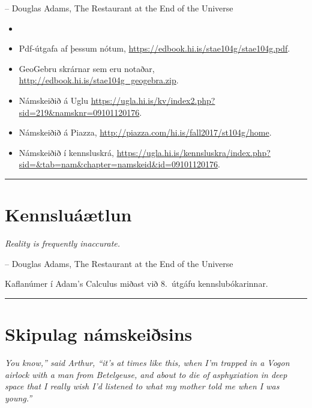 \documentclass[a4paper,10pt,icelandic]{sphinxmanual}
\begin{document}
-- Douglas Adams, The Restaurant at the End of the Universe
\begin{itemize}
\item {} 

\item {} 
Pdf-útgafa af þessum nótum, \href{https://edbook.hi.is/stae104g/stae104g.pdf}{https://edbook.hi.is/stae104g/stae104g.pdf}.

\item {} 
GeoGebru skrárnar sem eru notaðar, \href{http://edbook.hi.is/stae104g\_geogebra.zip}{http://edbook.hi.is/stae104g\_geogebra.zip}.

\item {} 
Námskeiðið á Uglu \href{https://ugla.hi.is/kv/index2.php?sid=219\&namsknr=09101120176}{https://ugla.hi.is/kv/index2.php?sid=219\&namsknr=09101120176}.

\item {} 
Námskeiðið á Piazza, \href{http://piazza.com/hi.is/fall2017/st104g/home}{http://piazza.com/hi.is/fall2017/st104g/home}.

\item {} 
Námskeiðið í kennsluskrá, \href{https://ugla.hi.is/kennsluskra/index.php?sid=\&tab=nam\&chapter=namskeid\&id=09101120176}{https://ugla.hi.is/kennsluskra/index.php?sid=\&tab=nam\&chapter=namskeid\&id=09101120176}.

\end{itemize}
\newpage

\bigskip\hrule{}\bigskip



\section{Kennsluáætlun}
\label{vidauki:kennsluaaetlun}
\emph{Reality is frequently inaccurate.}

-- Douglas Adams, The Restaurant at the End of the Universe

Kaflanúmer í Adam’s Calculus miðast við 8. útgáfu kennslubókarinnar.


\bigskip\hrule{}\bigskip

\newpage

\section{Skipulag námskeiðsins}
\label{vidauki:skipulag-namskeisins}
\emph{You know,'' said Arthur, ``it's at times like this, when I'm trapped in a
Vogon airlock with a man from Betelgeuse, and about to die of asphyxiation
in deep space that I really wish I'd listened to what my mother told me when I was young.''}
\end{document}
